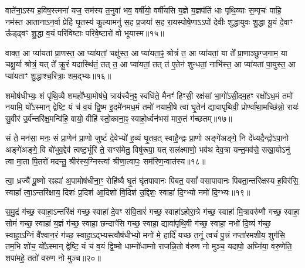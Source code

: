 वाते॑ना॒\-ऽस्य ह॒विष॒स्त्मना॑ यज॒ सम॑स्य त॒नुवा॑ भव॒ वर्\mbox{}षी॑यो॒ वर्\mbox{}षी॑यसि य॒ज्ञे य॒ज्ञप॑तिं धाः पृथि॒व्याः स॒म्पृचः॑ पाहि॒ नम॑स्त आताना\-ऽन॒र्वा प्रेहि॑ घृ॒तस्य॑ कु॒ल्यामनु॑ स॒ह प्र॒जया॑ स॒ह रा॒यस्पोषे॒णा\-ऽ\-ऽपो॑ देवीः शुद्धायुवः शु॒द्धा यू॒यं दे॒वाꣳ ऊ᳚ड्ढ्वꣳ शु॒द्धा व॒यं परि॑विष्टाः परिवे॒ष्टारो॑ वो भूयास्म॥१५॥

{\anuvakamend[{दे॒वेन॒ चतु॑श्चत्वारिꣳशच्च॥८॥}]}

वाक्त॒ आ प्या॑यतां प्रा॒णस्त॒ आ प्या॑यतां॒ चक्षु॑स्त॒ आ प्या॑यता॒ꣴ॒ श्रोत्रं॑ त॒ आ प्या॑यतां॒ या ते᳚ प्रा॒णाञ्छुग्ज॒गाम॒ या चक्षु॒र्या श्रोत्रं॒ यत् ते᳚ क्रू॒रं यदास्थि॑तं॒ तत् त॒ आ प्या॑यतां॒ तत् त॑ ए॒तेन॑ शुन्धतां॒ नाभि॑स्त॒ आ प्या॑यतां पा॒युस्त॒ आ प्या॑यताꣳ शु॒द्धाश्च॒रित्राः॒ शम॒द्भ्यः॥१६॥

शमोष॑धीभ्यः॒ शं पृ॑थि॒व्यै शमहो᳚भ्या॒मोष॑धे॒ त्राय॑स्वैन॒ꣴ॒ स्वधि॑ते॒ मैनꣳ॑ हिꣳसी॒ रक्ष॑सां भा॒गो॑\-ऽसी॒दम॒हꣳ रक्षो॑\-ऽध॒मं तमो॑ नयामि॒ यो᳚\-ऽस्मान् द्वेष्टि॒ यं च॑ व॒यं द्वि॒ष्म इ॒दमे॑नमध॒मं तमो॑ नयामी॒षे त्वा॑ घृ॒तेन॑ द्यावापृथिवी॒ प्रोर्ण्वा॑था॒मच्छि॑न्नो॒ रायः॑ सु॒वीर॑ उ॒र्व॑न्तरि॑क्ष॒मन्वि॑हि॒ वायो॒ वीहि॑ स्तो॒काना॒ꣴ॒ स्वाहो॒र्ध्वन॑भसं मारु॒तं ग॑च्छतम्॥१७॥

{\anuvakamend[{अ॒द्भ्यो वीहि॒ पञ्च॑ च॥९॥}]}

सं ते॒ मन॑सा॒ मनः॒ सं प्रा॒णेन॑ प्रा॒णो जुष्टं॑ दे॒वेभ्यो॑ ह॒व्यं घृ॒तव॒त् स्वाहै॒न्द्रः प्रा॒णो अङ्गे॑अङ्गे॒ नि दे᳚ध्यदै॒न्द्रो॑\-ऽपा॒नो अङ्गे॑अङ्गे॒ वि बो॑भुव॒द्देव॑ त्वष्ट॒र्भूरि॑ ते॒ सꣳस॑मेतु॒ विषु॑रूपा॒ यत् सल॑क्ष्माणो॒ भव॑थ देव॒त्रा यन्त॒मव॑से॒ सखा॒यो\-ऽनु॑ त्वा मा॒ता पि॒तरो॑ मदन्तु॒ श्रीर॑स्य॒ग्निस्त्वा᳚ श्रीणा॒त्वापः॒ सम॑रिण॒न्वात॑स्य॥१८॥

त्वा॒ ध्रज्यै॑ पू॒ष्णो रꣴह्या॑ अ॒पामोष॑धीना॒ꣳ॒ रोहि॑ष्यै घृ॒तं घृ॑तपावानः पिबत॒ वसां᳚ वसापावानः पिबता॒न्तरि॑क्षस्य ह॒विर॑सि॒ स्वाहा᳚ त्वा॒\-ऽन्तरि॑क्षाय॒ दिशः॑ प्र॒दिश॑ आ॒दिशो॑ वि॒दिश॑ उ॒द्दिशः॒ स्वाहा॑ दि॒ग्भ्यो नमो॑ दि॒ग्भ्यः॥१९॥

{\anuvakamend[{वात॑स्या॒ष्टाविꣳ॑शतिश्च॥10॥}]}

स॒मु॒द्रं ग॑च्छ॒ स्वाहा॒\-ऽन्तरि॑क्षं गच्छ॒ स्वाहा॑ दे॒वꣳ स॑वि॒तारं॑ गच्छ॒ स्वाहा॑\-ऽहोरा॒त्रे ग॑च्छ॒ स्वाहा॑ मि॒त्रावरु॑णौ गच्छ॒ स्वाहा॒ सोमं॑ गच्छ॒ स्वाहा॑ य॒ज्ञं ग॑च्छ॒ स्वाहा॒ छन्दाꣳ॑सि गच्छ॒ स्वाहा॒ द्यावा॑पृथि॒वी ग॑च्छ॒ स्वाहा॒ नभो॑ दि॒व्यं ग॑च्छ॒ स्वाहा॒\-ऽग्निं वै᳚श्वान॒रं ग॑च्छ॒ स्वाहा॒\-ऽद्भ्यस्त्वौष॑धीभ्यो॒ मनो॑ मे॒ हार्दि॑ यच्छ त॒नूं त्वचं॑ पु॒त्त्रं नप्ता॑रमशीय॒ शुग॑सि॒ तम॒भि शो॑च॒ यो᳚\-ऽस्मान् द्वेष्टि॒ यं च॑ व॒यं द्वि॒ष्मो धाम्नो॑धाम्नो राजन्नि॒तो व॑रुण नो मुञ्च॒ यदापो॒ अघ्नि॑या॒ वरु॒णेति॒ शपा॑महे॒ ततो॑ वरुण नो मुञ्च॥२०॥

